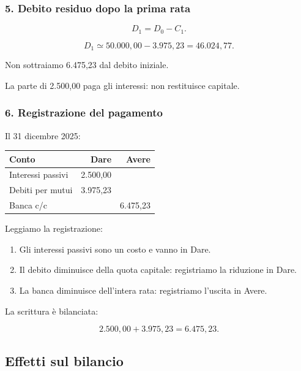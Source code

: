 \subsubsection*{5. Debito residuo
dopo la prima rata}

\[
D_1=D_0-C_1.
\]

\[
D_1
\simeq
50.000{,}00-3.975{,}23
=
\boxed{46.024{,}77}.
\]

\noindent Non sottraiamo 6.475,23
dal debito iniziale.

\noindent La parte di 2.500,00
paga gli interessi:
non restituisce capitale.


\subsubsection*{6. Registrazione del pagamento}

\noindent Il 31 dicembre 2025:

\begin{center}
    \begin{tabular}{|l|r|r|}
        \hline
        \textbf{Conto}
        & \textbf{Dare}
        & \textbf{Avere} \\
        \hline
        Interessi passivi
        & 2.500,00 & \\
        Debiti per mutui
        & 3.975,23 & \\
        Banca c/c
        & & 6.475,23 \\
        \hline
    \end{tabular}
\end{center}

\noindent Leggiamo la registrazione:

\begin{enumerate}
    \item Gli interessi passivi
    sono un costo e vanno in Dare.

    \item Il debito diminuisce
    della quota capitale:
    registriamo la riduzione in Dare.

    \item La banca diminuisce
    dell'intera rata:
    registriamo l'uscita in Avere.
\end{enumerate}

\noindent La scrittura è bilanciata:

\[
2.500{,}00+3.975{,}23
=
6.475{,}23.
\]


\subsection*{Effetti sul bilancio}


